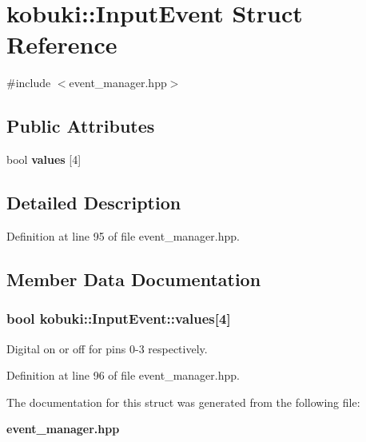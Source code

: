 \section{kobuki\-:\-:\-Input\-Event \-Struct \-Reference}
\label{structkobuki_1_1InputEvent}


{\ttfamily \#include $<$event\-\_\-manager.\-hpp$>$}

\subsection*{\-Public \-Attributes}
\begin{DoxyCompactItemize}
\item 
bool {\bf values} [4]
\end{DoxyCompactItemize}


\subsection{\-Detailed \-Description}


\-Definition at line 95 of file event\-\_\-manager.\-hpp.



\subsection{\-Member \-Data \-Documentation}
\subsubsection[{values}]{\setlength{\rightskip}{0pt plus 5cm}bool {\bf kobuki\-::\-Input\-Event\-::values}[4]}\label{structkobuki_1_1InputEvent_aca6f9a799c250a9e69d011e85bf6b0eb}
\-Digital on or off for pins 0-\/3 respectively. 

\-Definition at line 96 of file event\-\_\-manager.\-hpp.



\-The documentation for this struct was generated from the following file\-:\begin{DoxyCompactItemize}
\item 
{\bf event\-\_\-manager.\-hpp}\end{DoxyCompactItemize}
